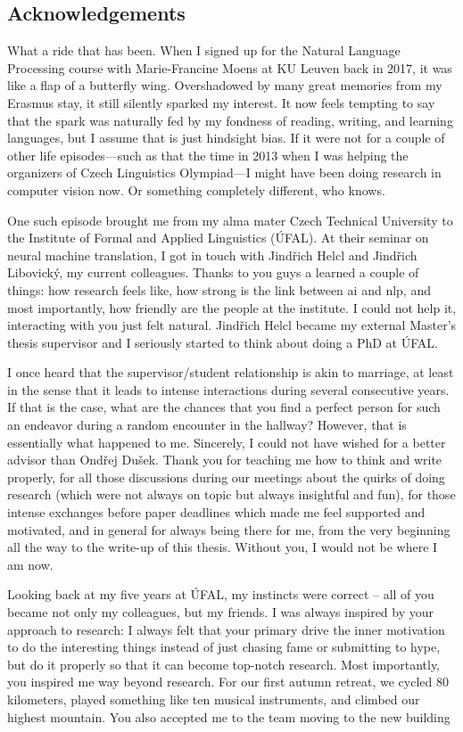 \documentclass[12pt,notitlepage,a4paper,openright]{report}
\begin{document}
\subsection*{Acknowledgements}
{
  What a ride that has been. When I signed up for the Natural Language Processing course with Marie-Francine Moens at KU Leuven back in 2017, it was like a flap of a butterfly wing. Overshadowed by many great memories from my Erasmus stay, it still silently sparked my interest. It now feels tempting to say that the spark was naturally fed by my fondness of reading, writing, and learning languages, but I assume that is just hindsight bias. If it were not for a couple of other life episodes---such as that the time in 2013 when I was helping the organizers of Czech Linguistics Olympiad---I might have been doing research in computer vision now. Or something completely different, who knows.

  One such episode brought me from my alma mater Czech Technical University to the Institute of Formal and Applied Linguistics (ÚFAL). At their seminar on neural machine translation, I got in touch with Jindřich Helcl and Jindřich Libovický, my current colleagues. Thanks to you guys a learned a couple of things: how research feels like, how strong is the link between \acs{ai} and \acs{nlp}, and most importantly, how friendly are the people at the institute. I could not help it, interacting with you just felt natural. Jindřich Helcl became my external Master's thesis supervisor and I seriously started to think about doing a PhD  at ÚFAL.

  I once heard that the supervisor/student relationship is akin to marriage, at least in the sense that it leads to intense interactions during several consecutive years. If that is the case, what are the chances that you find a perfect person for such an endeavor during a random encounter in the hallway? However, that is essentially what happened to me. Sincerely, I could not have wished for a better advisor than Ondřej Dušek. Thank you for teaching me how to think and write properly, for all those discussions during our meetings about the quirks of doing research (which were not always on topic but always insightful and fun), for those intense exchanges before paper deadlines which made me feel supported and motivated, and in general for always being there for me, from the very beginning all the way to the write-up of this thesis. Without you, I would not be where I am now.

  Looking back at my five years at ÚFAL, my instincts were correct -- all of you became not only my colleagues, but my friends. I was always inspired by your approach to research: I always felt that your primary drive the inner motivation to do the interesting things instead of just chasing fame or submitting to hype, but do it properly so that it can become top-notch research. Most importantly, you inspired me way beyond research. For our first autumn retreat, we cycled 80 kilometers, played something like ten musical instruments, and climbed our highest mountain. You also accepted me to the team moving to the new building



}
\end{document}
